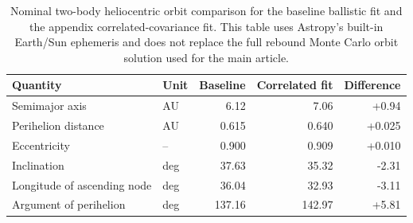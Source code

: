 \begin{table}
  \centering
  \caption{Nominal two-body heliocentric orbit comparison for the baseline ballistic fit and the appendix correlated-covariance fit.  This table uses Astropy's built-in Earth/Sun ephemeris and does not replace the full rebound Monte Carlo orbit solution used for the main article.}
  \label{tab:appendix-correlated-orbit-change}
  \begin{tabular}{llrrr}
    \toprule
    Quantity & Unit & Baseline & Correlated fit & Difference \\
    \midrule
    Semimajor axis & AU & 6.12 & 7.06 & +0.94 \\
    Perihelion distance & AU & 0.615 & 0.640 & +0.025 \\
    Eccentricity & -- & 0.900 & 0.909 & +0.010 \\
    Inclination & deg & 37.63 & 35.32 & -2.31 \\
    Longitude of ascending node & deg & 36.04 & 32.93 & -3.11 \\
    Argument of perihelion & deg & 137.16 & 142.97 & +5.81 \\
    \bottomrule
  \end{tabular}
\end{table}
